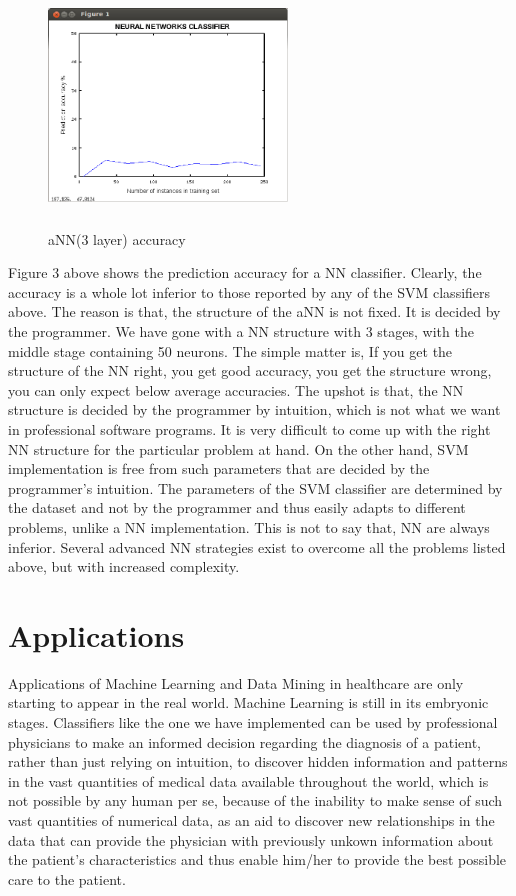 \documentclass{acm_proc_article-sp}
\begin{document}
\begin{figure}
\centering
\includegraphics[width=2.5in, height=2.5in]{nn.png}
\caption{aNN(3 layer) accuracy}
\end{figure}
Figure 3 above shows the prediction accuracy for a NN classifier. Clearly, the accuracy is a whole lot inferior to those reported by any of the SVM classifiers above. The reason is that, the structure of the aNN is not fixed. It is decided by the programmer. We have gone with a NN structure with 3 stages, with the middle stage containing 50 neurons. The simple matter is, If you  get the structure of the NN right, you get good accuracy, you get the structure wrong, you can only expect below average accuracies. The upshot is that, the NN structure is decided by the programmer by intuition, which is not what we want in professional software programs. It is very difficult to come up with the right NN structure for the particular problem at hand. On the other hand, SVM implementation is free from such parameters that are decided by the programmer's intuition. The parameters of the SVM classifier are determined by the dataset and not by the programmer and thus easily adapts to different problems, unlike a NN implementation. This is not to say that, NN are always inferior. Several advanced NN strategies exist to overcome all the problems listed above, but with increased complexity.

\section{Applications}

Applications of Machine Learning and Data Mining in healthcare are only starting to appear in the real world. Machine Learning is still in its embryonic stages. Classifiers like the one we have implemented can be used by professional physicians to make an informed decision regarding the diagnosis of a patient, rather than just relying on intuition, to discover hidden information and patterns in the vast quantities of medical data available throughout the world, which is not possible by any human per se, because of the inability to make sense of such vast quantities of numerical data, as an aid to discover new relationships in the data that can provide the physician with previously unkown information about the patient's characteristics and thus enable him/her to provide the best possible care to the patient.  
\end{document}
